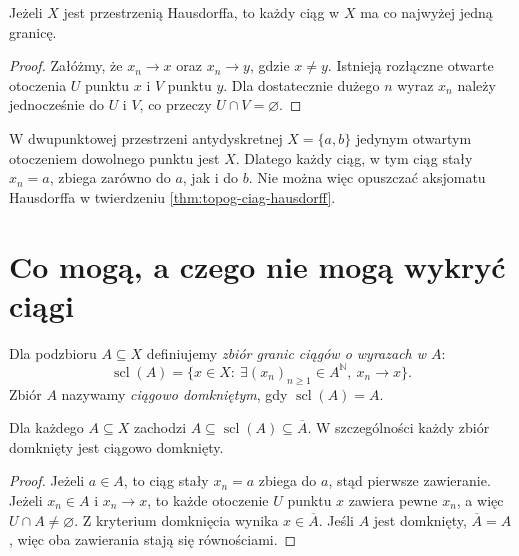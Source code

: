 \begin{twierdzenie}
\label{thm:topog-ciag-hausdorff}
Jeżeli $X$ jest przestrzenią Hausdorffa, to każdy ciąg w $X$
ma co najwyżej jedną granicę.
\end{twierdzenie}
\begin{proof}
Załóżmy, że $x_n\to x$ oraz $x_n\to y$, gdzie $x\ne y$.
Istnieją rozłączne otwarte otoczenia $U$ punktu $x$ i $V$
punktu $y$. Dla dostatecznie dużego $n$ wyraz $x_n$ należy
jednocześnie do $U$ i $V$, co przeczy $U\cap V=\varnothing$.
\end{proof}

\begin{przyklad}
\label{ex:topog-ciag-wiele-granic}
W dwupunktowej przestrzeni antydyskretnej
$X=\{a,b\}$ jedynym otwartym otoczeniem dowolnego punktu
jest $X$. Dlatego każdy ciąg, w tym ciąg stały $x_n=a$,
zbiega zarówno do $a$, jak i do $b$. Nie można więc
opuszczać aksjomatu Hausdorffa w
 twierdzeniu \ref{thm:topog-ciag-hausdorff}.
\end{przyklad}

\section{Co mogą, a czego nie mogą wykryć ciągi}
\label{sec:topog-ciagi-ograniczenia}

\begin{definicja}
\label{def:topog-domkniecie-ciagowe}
Dla podzbioru $A\subseteq X$ definiujemy
\emph{zbiór granic ciągów o wyrazach w $A$}:
\[
\operatorname{scl}(A)=
\{x\in X:\ \exists(x_n)_{n\ge1}\in A^{\mathbb N},\ x_n\to x\}.
\]
Zbiór $A$ nazywamy \emph{ciągowo domkniętym}, gdy
$\operatorname{scl}(A)=A$.
\end{definicja}

\begin{stwierdzenie}
\label{prop:topog-ciagi-domkniecie}
Dla każdego $A\subseteq X$ zachodzi
$A\subseteq\operatorname{scl}(A)\subseteq\overline A$.
W szczególności każdy zbiór domknięty jest ciągowo domknięty.
\end{stwierdzenie}
\begin{proof}
Jeżeli $a\in A$, to ciąg stały $x_n=a$ zbiega do $a$,
stąd pierwsze zawieranie. Jeżeli $x_n\in A$ i $x_n\to x$,
to każde otoczenie $U$ punktu $x$ zawiera pewne $x_n$,
a więc $U\cap A\ne\varnothing$. Z kryterium domknięcia
wynika $x\in\overline A$. Jeśli $A$ jest domknięty,
$\overline A=A$, więc oba zawierania stają się równościami.
\end{proof}

